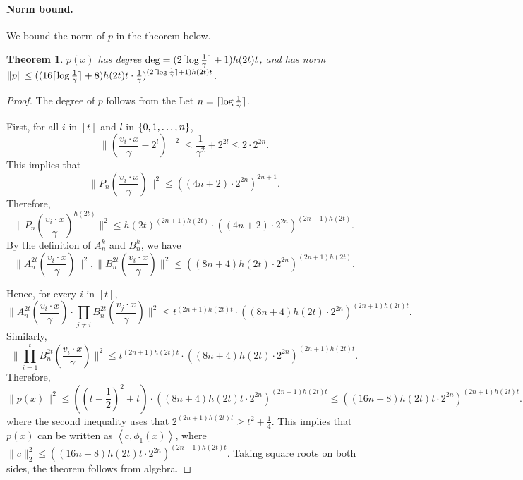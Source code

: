 \documentclass{article}
\DeclarePairedDelimiter\ceil{\lceil}{\rceil}
\newcommand{\inner}[1]{ \left\langle {#1} \right\rangle }
\newtheorem{theorem}{Theorem}
\begin{document}
\paragraph{Norm bound.} We bound the norm of $p$ in the theorem below.
\begin{theorem}
$p(x)$ has degree $\deg = (2\ceil{\log \frac 1 \gamma}+1)h(2t)t$, and has norm $\|p\| \leq ((16\ceil{\log \frac 1 \gamma}+8) h(2t) t \cdot \frac 1 \gamma)^{(2\ceil{\log \frac 1 \gamma}+1)h(2t)t}$.
\label{thm:rational-norm}
\end{theorem}
\begin{proof}
The degree of $p$ follows from the
Let $n = \ceil{\log \frac 1 \gamma}$.

First, for all $i$ in $[t]$ and $l$ in $\cbr{0,1,\ldots,n}$,
\[ \| (\frac{v_i \cdot x}{\gamma} - 2^l) \|^2 \leq \frac{1}{\gamma^2} + 2^{2l} \leq 2 \cdot 2^{2n}. \]
This implies that
\[ \| P_n(\frac{v_i \cdot x}{\gamma}) \|^2 \leq ((4n+2) \cdot 2^{2n})^{2n+1}. \]
Therefore,
\[ \| P_n(\frac{v_i \cdot x}{\gamma})^{h(2t)} \|^2 \leq h(2t)^{(2n+1)h(2t)} \cdot ((4n+2) \cdot 2^{2n})^{(2n+1)h(2t)}. \]
By the definition of $A_n^k$ and $B_n^k$, we have
\[ \| A_n^{2t}(\frac{v_i \cdot x}{\gamma}) \|^2,  \| B_n^{2t}(\frac{v_i \cdot x}{\gamma}) \|^2 \leq ((8n+4) h(2t) \cdot 2^{2n})^{(2n+1)h(2t)}. \]

Hence, for every $i$ in $[t]$,
\[
\| A_n^{2t}(\frac{v_i \cdot x}{\gamma}) \cdot \prod_{j \neq i} B_n^{2t}(\frac{v_j \cdot x}{\gamma}) \|^2
\leq
t^{(2n+1) h(2t) t} \cdot ((8n+4) h(2t) \cdot 2^{2n})^{(2n+1)h(2t)t}.
\]
Similarly,
\[
\| \prod_{i=1}^t B_n^{2t}(\frac{v_i \cdot x}{\gamma}) \|^2 \leq t^{(2n+1) h(2t) t} \cdot ((8n+4) h(2t) \cdot 2^{2n})^{(2n+1)h(2t)t}.
\]
Therefore,
\[
\| p(x) \|^2 \leq ((t - \frac 1 2)^2 + t) \cdot ((8n+4) h(2t) t \cdot 2^{2n})^{(2n+1)h(2t)t} \leq ((16n+8) h(2t) t \cdot 2^{2n})^{(2n+1)h(2t)t}.
\]
where the second inequality uses that $2^{(2n+1)h(2t)t} \geq t^2 + \frac 1 4$.
This implies that $p(x)$ can be written as $\inner{c, \phi_1(x)}$, where $\| c \|_2^2 \leq ((16n+8) h(2t) t \cdot 2^{2n})^{(2n+1)h(2t)t}$. Taking square roots on both sides, the theorem follows from algebra.
\end{proof}
\end{document}
